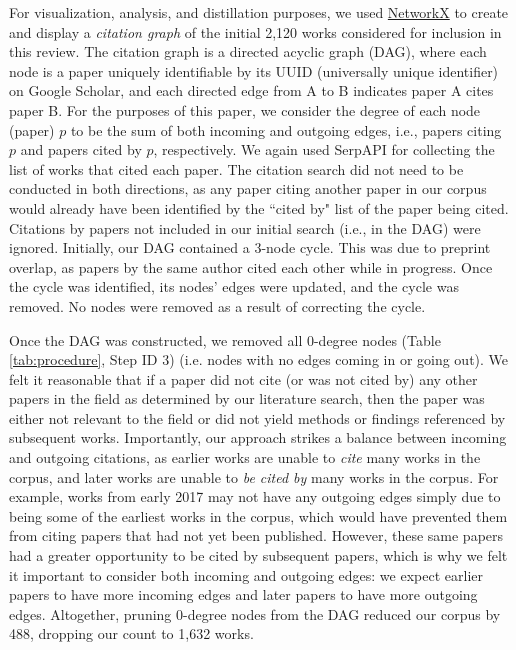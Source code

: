 \documentclass[manuscript,screen,review]{acmart}
\begin{document}
For visualization, analysis, and distillation purposes, we used \href{https://networkx.org/}{NetworkX} to create and display a \textit{citation graph} of the initial 2,120 works considered for inclusion in this review. The citation graph is a directed acyclic graph (DAG), where each node is a paper uniquely identifiable by its UUID (universally unique identifier) on Google Scholar, and each directed edge from A to B indicates paper A cites paper B. For the purposes of this paper, we consider the degree of each node (paper) $p$ to be the sum of both incoming and outgoing edges, i.e., papers citing $p$ and papers cited by $p$, respectively. We again used SerpAPI for collecting the list of works that cited each paper. The citation search did not need to be conducted in both directions, as any paper citing another paper in our corpus would already have been identified by the ``cited by" list of the paper being cited. Citations by papers not included in our initial search (i.e., in the DAG) were ignored. Initially, our DAG contained a 3-node cycle. This was due to preprint overlap, as papers by the same author cited each other while in progress. Once the cycle was identified, its nodes' edges were updated, and the cycle was removed. No nodes were removed as a result of correcting the cycle.

Once the DAG was constructed, we removed all 0-degree nodes (Table \ref{tab:procedure}, Step ID 3) (i.e. nodes with no edges coming in or going out). We felt it reasonable that if a paper did not cite (or was not cited by) any other papers in the field as determined by our literature search, then the paper was either not relevant to the field or did not yield methods or findings referenced by subsequent works. Importantly, our approach strikes a balance between incoming and outgoing citations, as earlier works are unable to \textit{cite} many works in the corpus, and later works are unable to \textit{be cited by} many works in the corpus. For example, works from early 2017 may not have any outgoing edges simply due to being some of the earliest works in the corpus, which would have prevented them from citing papers that had not yet been published. However, these same papers had a greater opportunity to be cited by subsequent papers, which is why we felt it important to consider both incoming and outgoing edges: we expect earlier papers to have more incoming edges and later papers to have more outgoing edges. Altogether, pruning 0-degree nodes from the DAG reduced our corpus by 488, dropping our count to 1,632 works.
\end{document}
